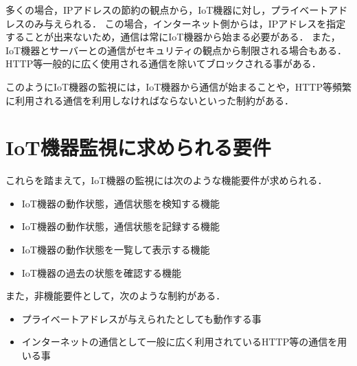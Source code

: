 多くの場合，IPアドレスの節約の観点から，IoT機器に対し，プライベートアドレスのみ与えられる．
この場合，インターネット側からは，IPアドレスを指定することが出来ないため，通信は常にIoT機器から始まる必要がある．
また，IoT機器とサーバーとの通信がセキュリティの観点から制限される場合もある．
HTTP等一般的に広く使用される通信を除いてブロックされる事がある．
\medskip

このようにIoT機器の監視には，IoT機器から通信が始まることや，HTTP等頻繁に利用される通信を利用しなければならないといった制約がある．


\section{IoT機器監視に求められる要件}%
これらを踏まえて，IoT機器の監視には次のような機能要件が求められる．
\begin{itemize}
	\item IoT機器の動作状態，通信状態を検知する機能
	\item IoT機器の動作状態，通信状態を記録する機能
	\item IoT機器の動作状態を一覧して表示する機能
	\item IoT機器の過去の状態を確認する機能
\end{itemize}
また，非機能要件として，次のような制約がある．
\begin{itemize}
	\item プライベートアドレスが与えられたとしても動作する事
	\item インターネットの通信として一般に広く利用されているHTTP等の通信を用いる事
\end{itemize}

